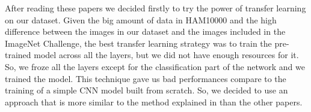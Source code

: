 	\smallskip
	
	After reading these papers we decided firstly to try the power of transfer learning on our dataset. Given the big amount of data in HAM10000 and the high difference between the images in our dataset and the images included in the ImageNet Challenge, the best transfer learning strategy was to train the pre-trained model across all the layers, but we did not have enough resources for it. So, we froze all the layers except for the classification part of the network and we trained the model. This technique gave us bad performances compare to the training of a simple CNN model built from scratch. So, we decided to use an approach that is more similar to the method explained in \cite{article2} than the other papers.
	